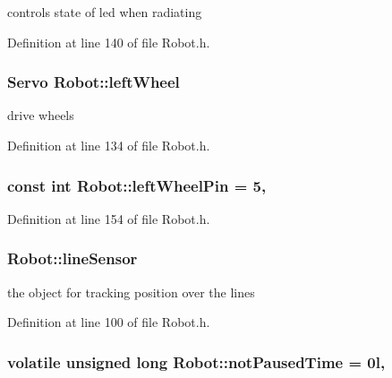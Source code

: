 controls state of led when radiating 



Definition at line 140 of file Robot.\-h.

\hypertarget{classRobot_af357e059c6c07190c92c6c9a00e2b8af}{
\subsubsection[{left\-Wheel}]{\setlength{\rightskip}{0pt plus 5cm}Servo Robot\-::left\-Wheel\hspace{0.3cm}{\ttfamily [private]}}}\label{classRobot_af357e059c6c07190c92c6c9a00e2b8af}


drive wheels 



Definition at line 134 of file Robot.\-h.

\hypertarget{classRobot_a46298d7fb4c8c3932221c6a5ac14af9d}{
\subsubsection[{left\-Wheel\-Pin}]{\setlength{\rightskip}{0pt plus 5cm}const int Robot\-::left\-Wheel\-Pin = 5\hspace{0.3cm}{\ttfamily [static]}, {\ttfamily [private]}}}\label{classRobot_a46298d7fb4c8c3932221c6a5ac14af9d}


Definition at line 154 of file Robot.\-h.

\hypertarget{classRobot_abdc300045bea9a31013b25682629752d}{
\subsubsection[{line\-Sensor}]{ Robot\-::line\-Sensor}}\label{classRobot_abdc300045bea9a31013b25682629752d}


the object for tracking position over the lines 



Definition at line 100 of file Robot.\-h.

\hypertarget{classRobot_a4eb9957add77241230cdf010b4eced16}{
\subsubsection[{not\-Paused\-Time}]{\setlength{\rightskip}{0pt plus 5cm}volatile unsigned long Robot\-::not\-Paused\-Time = 0l\hspace{0.3cm}{\ttfamily [static]}, {\ttfamily [private]}}}\label{classRobot_a4eb9957add77241230cdf010b4eced16}



